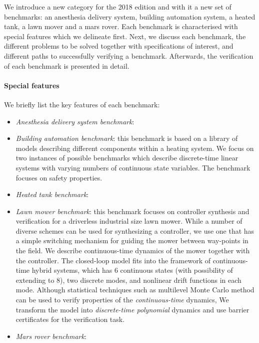 \documentclass[EPiC]{easychair}
\begin{document}
We introduce a new category for the 2018 edition and with it a new set of benchmarks: an anesthesia delivery system, building automation system, a heated tank, a lawn mover and a mars rover. Each benchmark is characterised with special features which we delineate first. Next, we discuss each benchmark, the different problems to be solved together with specifications of interest, and different paths to successfully verifying a benchmark. Afterwards, the verification of each benchmark is presented in detail. \\

\paragraph{Special features} We briefly list the key features of each benchmark:
\begin{itemize}
	\item \textit{Anesthesia delivery system benchmark}: 
	\item \textit{Building automation benchmark}: this benchmark is based on a library of models describing different components within a heating system. We focus on two instances of possible benchmarks which describe discrete-time linear systems with varying numbers of continuous state variables. The benchmark focuses on safety properties.
	\item \textit{Heated tank benchmark}: 
    \item \textit{Lawn mower benchmark}: this benchmark focuses on controller synthesis and verification for a driverless industrial size lawn mower. While a number of diverse schemes can be used for synthesizing a controller, we use one that has a simple switching mechanism for guiding the mower between way-points in the field. We describe continuous-time dynamics of the mower together with the controller. The closed-loop model fits into the framework of continuous-time hybrid systems, which has 6 continuous states (with possibility of extending to 8), two discrete modes, and nonlinear drift functions in each mode.
Although statistical techniques such as multilevel Monte Carlo method \cite{MLMC_SRN_17} can be used to verify properties of the \emph{continuous-time} dynamics,
 We transform the model into \emph{discrete-time polynomial} dynamics and use barrier certificates \textcolor{blue}{\cite{}} for the verification task.  
    \item \textit{Mars rover benchmark}:
\end{itemize}
\end{document}
